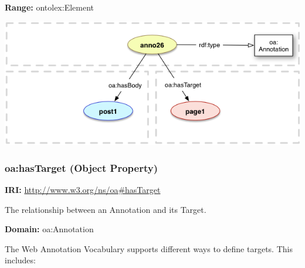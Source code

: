 \documentclass[a4paper]{article}
\newcommand\textstyleStrongEmphasis[1]{\textbf{#1}}
\begin{document}
\textstyleStrongEmphasis{Range:} ontolex:Element

 \includegraphics{index-img/index-img006.png}  

\subsubsection[oa:hasTarget (Object Property)]{oa:hasTarget (Object Property)}
\textstyleStrongEmphasis{IRI:} \url{http://www.w3.org/ns/oa#hasTarget}

The relationship between an Annotation and its Target.

\textstyleStrongEmphasis{Domain:} oa:Annotation

The Web Annotation Vocabulary supports different ways to define targets. This includes: 
\end{document}
